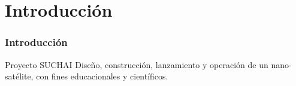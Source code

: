 \documentclass[xcolor=dvipsnames]{beamer}
\begin{document}
	\section{Introducción}
	\begin{frame}
		\frametitle{Introducción}
		
		\begin{block}{Proyecto SUCHAI}
		Diseño, construcción,  lanzamiento y operación de un nano-satélite, con fines educacionales y científicos.\\
		\vspace{0.3cm}
		\end{block}
		
		\begin{figure}[b]\centering
            \hspace{2cm}
        \end{figure}
		
	\end{frame}
	
\end{document}
